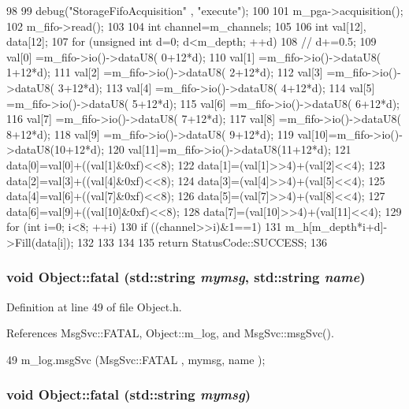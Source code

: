 \begin{DoxyCode}
98                                              {
99   debug("StorageFifoAcquisition" , "execute");
100 
101   m_pga->acquisition();
102   m_fifo->read();
103     
104   int channel=m_channels;
105 
106   int val[12], data[12];
107   for (unsigned int d=0; d<m_depth; ++d){
108     //      d+=0.5;
109     val[0] =m_fifo->io()->dataU8( 0+12*d);
110     val[1] =m_fifo->io()->dataU8( 1+12*d);
111     val[2] =m_fifo->io()->dataU8( 2+12*d);
112     val[3] =m_fifo->io()->dataU8( 3+12*d);
113     val[4] =m_fifo->io()->dataU8( 4+12*d);
114     val[5] =m_fifo->io()->dataU8( 5+12*d);
115     val[6] =m_fifo->io()->dataU8( 6+12*d);
116     val[7] =m_fifo->io()->dataU8( 7+12*d);
117     val[8] =m_fifo->io()->dataU8( 8+12*d);
118     val[9] =m_fifo->io()->dataU8( 9+12*d);
119     val[10]=m_fifo->io()->dataU8(10+12*d);
120     val[11]=m_fifo->io()->dataU8(11+12*d);
121     data[0]=val[0]+((val[1]&0xf)<<8);
122     data[1]=(val[1]>>4)+(val[2]<<4);
123     data[2]=val[3]+((val[4]&0xf)<<8);
124     data[3]=(val[4]>>4)+(val[5]<<4);
125     data[4]=val[6]+((val[7]&0xf)<<8);
126     data[5]=(val[7]>>4)+(val[8]<<4);
127     data[6]=val[9]+((val[10]&0xf)<<8);
128     data[7]=(val[10]>>4)+(val[11]<<4);
129     for (int i=0; i<8; ++i){
130       if ((channel>>i)&1==1){
131     m_h[m_depth*i+d]->Fill(data[i]);
132       }
133     }
134   }
135   return StatusCode::SUCCESS;
136 }
\end{DoxyCode}
\hypertarget{classObject_ae62acd3d09f716220f75f252dc38bc9a}{
\subsubsection[{fatal}]{\setlength{\rightskip}{0pt plus 5cm}void Object::fatal (std::string {\em mymsg}, \/  std::string {\em name})}}
\label{classObject_ae62acd3d09f716220f75f252dc38bc9a}


Definition at line 49 of file Object.h.

References MsgSvc::FATAL, Object::m\_\-log, and MsgSvc::msgSvc().


\begin{DoxyCode}
49 { m_log.msgSvc (MsgSvc::FATAL   , mymsg, name ); }
\end{DoxyCode}
\hypertarget{classObject_aad5a16aac7516ce65bd5ec02ab07fc80}{
\subsubsection[{fatal}]{\setlength{\rightskip}{0pt plus 5cm}void Object::fatal (std::string {\em mymsg})}}
\label{classObject_aad5a16aac7516ce65bd5ec02ab07fc80}


